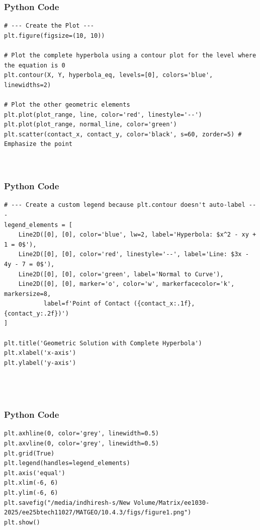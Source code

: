 \documentclass{beamer}
\begin{document}
    \begin{frame}[fragile]
        \frametitle{Python Code}
        \begin{lstlisting}
# --- Create the Plot ---
plt.figure(figsize=(10, 10))

# Plot the complete hyperbola using a contour plot for the level where the equation is 0
plt.contour(X, Y, hyperbola_eq, levels=[0], colors='blue', linewidths=2)

# Plot the other geometric elements
plt.plot(plot_range, line, color='red', linestyle='--')
plt.plot(plot_range, normal_line, color='green')
plt.scatter(contact_x, contact_y, color='black', s=60, zorder=5) # Emphasize the point



        \end{lstlisting}
    \end{frame}

    \begin{frame}[fragile]
        \frametitle{Python Code}
        \begin{lstlisting}
# --- Create a custom legend because plt.contour doesn't auto-label ---
legend_elements = [
    Line2D([0], [0], color='blue', lw=2, label='Hyperbola: $x^2 - xy + 1 = 0$'),
    Line2D([0], [0], color='red', linestyle='--', label='Line: $3x - 4y - 7 = 0$'),
    Line2D([0], [0], color='green', label='Normal to Curve'),
    Line2D([0], [0], marker='o', color='w', markerfacecolor='k', markersize=8,
           label=f'Point of Contact ({contact_x:.1f}, {contact_y:.2f})')
]

plt.title('Geometric Solution with Complete Hyperbola')
plt.xlabel('x-axis')
plt.ylabel('y-axis')

    
   
        \end{lstlisting}
    \end{frame}

    \begin{frame}[fragile]
        \frametitle{Python Code}
        \begin{lstlisting}
plt.axhline(0, color='grey', linewidth=0.5)
plt.axvline(0, color='grey', linewidth=0.5)
plt.grid(True)
plt.legend(handles=legend_elements)
plt.axis('equal')
plt.xlim(-6, 6)
plt.ylim(-6, 6)
plt.savefig("/media/indhiresh-s/New Volume/Matrix/ee1030-2025/ee25btech11027/MATGEO/10.4.3/figs/figure1.png")
plt.show()


    
   
        \end{lstlisting}
    \end{frame}
\end{document}
